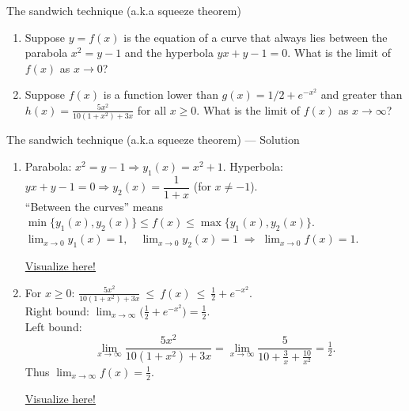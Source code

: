 \documentclass[9pt]{beamer}
\begin{document}
\begin{frame}{The sandwich technique (a.k.a squeeze theorem)}

    \begin{enumerate}[leftmargin = 0.5cm, label = \arabic*., rightmargin = 0.2cm]
        \item Suppose $y = f(x)$ is the equation of a curve that always lies between the parabola $x^2 = y - 1$ and the hyperbola $yx + y - 1 = 0$. What is the limit of $f(x)$ as $x\rightarrow 0$?

        \item Suppose $f(x)$ is a function lower than $g(x) = 1/2 + e^{-x^2}$ and greater than $h(x) = \frac{5x^2}{10(1+x^2) + 3x}$ for all $x \geq 0$. What is the limit of $f(x)$ as $x\rightarrow \infty$?
    \end{enumerate}
     
\end{frame}

\begin{frame}{The sandwich technique (a.k.a squeeze theorem) — Solution}

\small
\begin{enumerate}[leftmargin=0.5cm, label=\arabic*., rightmargin=0.2cm]

\item Parabola: $x^2=y-1 \Rightarrow y_1(x)=x^2+1$.
\quad Hyperbola: $yx+y-1=0 \Rightarrow y_2(x)=\dfrac{1}{1+x}$ (for $x\neq-1$).\\
“Between the curves” means $\min\{y_1(x),y_2(x)\}\le f(x)\le \max\{y_1(x),y_2(x)\}$.\\
$\displaystyle \lim_{x\to0}y_1(x)=1,\quad \lim_{x\to0}y_2(x)=1
\;\Rightarrow\; \boxed{\lim_{x\to0}f(x)=1}$. \\

\begin{center}
    \href{https://www.desmos.com/calculator/kwd4npf7tn}{Visualize here!}
\end{center}

\vspace{0.3cm}
\item For $x\ge 0$: $\displaystyle \frac{5x^2}{10(1+x^2)+3x}\ \le\ f(x)\ \le\ \frac12+e^{-x^2}$.\\
Right bound: $\displaystyle \lim_{x\to\infty}\Big(\tfrac12+e^{-x^2}\Big)=\tfrac12$.\\
Left bound:
\[
\lim_{x\to\infty}\frac{5x^2}{10(1+x^2)+3x}
=\lim_{x\to\infty}\frac{5}{10+\frac{3}{x}+\frac{10}{x^2}}=\tfrac12.
\]
Thus $\boxed{\lim_{x\to\infty}f(x)=\tfrac12}$. \\

\begin{center}
    \href{https://www.desmos.com/calculator/u9pxu613n6}{Visualize here!}
\end{center}

\end{enumerate}

\end{frame}
\end{document}
